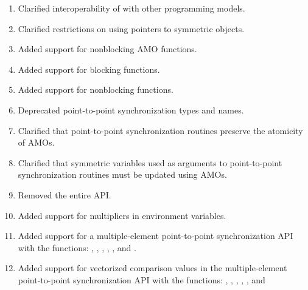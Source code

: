 \begin{enumerate}
{  subsec:shmem_broadcast,
  subsec:shmem_collect,
  subsec:shmem_reductions}%
%
\item Clarified interoperability of \openshmem with other programming models.
%
%
\item Clarified restrictions on using pointers to symmetric objects.
%
%
\item Added support for nonblocking \ac{AMO} functions.
%
%
\item Added support for blocking  functions.
%
%
\item Added support for nonblocking  functions.
%
%
\item Deprecated point-to-point synchronization types and names.
%
%
\item Clarified that point-to-point synchronization routines preserve the
  atomicity of \openshmem \acp{AMO}.
%
%
\item Clarified that symmetric variables used as  arguments to
  point-to-point synchronization routines must be updated using \openshmem
  \acp{AMO}.
%
%
\item Removed the entire \openshmem \Fortran \ac{API}.
%
%
\item Added support for multipliers in 
environment variables.
%
%
\item Added support for a multiple-element point-to-point synchronization \ac{API} with
  the functions: , ,
  , ,
  , and .
%
%
\item Added support for vectorized comparison values in the multiple-element
  point-to-point synchronization \ac{API} with the functions:
  , ,
  ,
  , , and

\end{enumerate}
